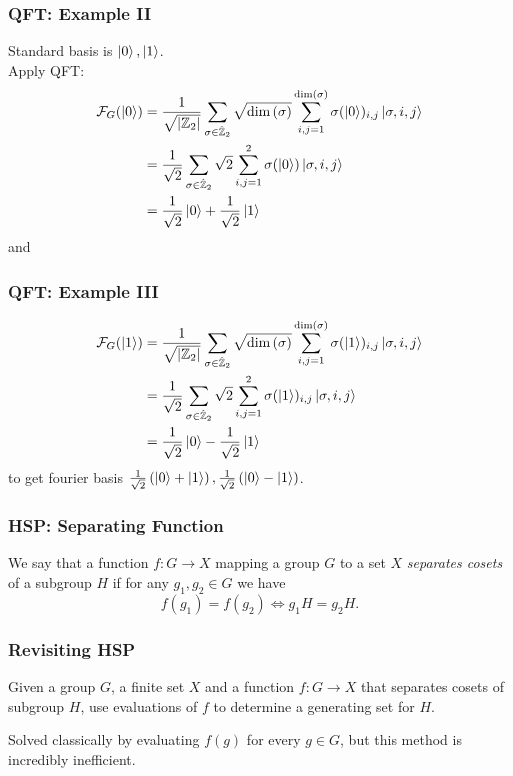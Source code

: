 \documentclass{beamer}
\renewcommand{\ket}{\Ket}
\newcommand{\abs}[1]{\left\lvert #1 \right\rvert}
\renewcommand{\dim}[1]{\textnormal{dim}\left(#1\right)}
\newcommand{\bb}[1]{\mathbb{#1}}
\renewcommand{\cal}[1]{\mathcal{#1}}
\begin{document}
\begin{frame}
\frametitle{QFT: Example II}
        Standard basis is $\ket{0}, \ket{1}$.\\\pause
        Apply QFT:\pause
        \begin{align*}
        \cal{F}_G(\ket{0}) &= \frac{1}{\sqrt{\abs{\bb{Z}_2}}} \sum_{\sigma \in \hat{\bb{Z}}_2} \sqrt{\dim{\sigma}} \sum_{i,j = 1}^{\dim{\sigma}} \sigma(\ket{0})_{i,j} \ket{\sigma, i, j}\\
        &= \frac{1}{\sqrt{2}} \sum_{\sigma \in \hat{\bb{Z}}_2} \sqrt{2} \sum_{i, j = 1}^2 \sigma(\ket{0}) \ket{\sigma, i, j}\\
        &= \frac{1}{\sqrt{2}} \ket{0} + \frac{1}{\sqrt{2}} \ket{1}
        \end{align*}\pause
        and
\end{frame}
\begin{frame}
\frametitle{QFT: Example III}
        \begin{align*}
        \cal{F}_G(\ket{1}) &= \frac{1}{\sqrt{\abs{\bb{Z}_2}}} \sum_{\sigma \in \hat{\bb{Z}}_2} \sqrt{\dim{\sigma}} \sum_{i,j = 1}^{\dim{\sigma}} \sigma(\ket{1})_{i,j} \ket{\sigma, i, j}\\
        &= \frac{1}{\sqrt{2}} \sum_{\sigma \in \hat{\bb{Z}}_2} \sqrt{2} \sum_{i,j = 1}^2 \sigma(\ket{1})_{i,j} \ket{\sigma, i, j}\\
        &= \frac{1}{\sqrt{2}} \ket{0} - \frac{1}{\sqrt{2}} \ket{1}
        \end{align*}\pause
        to get fourier basis $\frac{1}{\sqrt{2}} \left(\ket{0} + \ket{1}\right), \frac{1}{\sqrt{2}} \left( \ket{0} - \ket{1}\right)$.
\end{frame}

\begin{frame}
\frametitle{HSP: Separating Function}\label{sec:HSP}
    \begin{definition}\label{def:separating_function}
            We say that a function $f : G \to X$ mapping a group $G$ to a set $X$ \textit{separates cosets} of a subgroup $H$ if for any $g_1, g_2 \in G$ we have $$f(g_1) = f(g_2) \iff g_1 H = g_2 H.$$
        \end{definition}
\end{frame}

\begin{frame}
\frametitle{Revisiting HSP}
        \begin{problem}
            Given a group $G$, a finite set $X$ and a function $f: G \to X$ that separates cosets of subgroup $H$, use evaluations of $f$ to determine a generating set for $H$.
        \end{problem}
        Solved classically by evaluating $f(g)$ for every $g \in G$, but this method is incredibly inefficient.
\end{frame}
\end{document}
